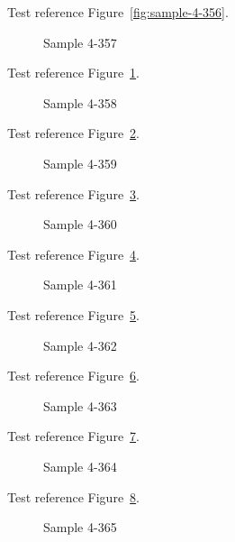 Test reference Figure~\ref{fig:sample-4-356}.

\begin{figure}[tbhp]
\caption{Sample 4-357}
\label{fig:sample-4-357}
\end{figure}

Test reference Figure~\ref{fig:sample-4-357}.

\begin{figure}[tbhp]
\caption{Sample 4-358}
\label{fig:sample-4-358}
\end{figure}

Test reference Figure~\ref{fig:sample-4-358}.

\begin{figure}[tbhp]
\caption{Sample 4-359}
\label{fig:sample-4-359}
\end{figure}

Test reference Figure~\ref{fig:sample-4-359}.

\begin{figure}[tbhp]
\caption{Sample 4-360}
\label{fig:sample-4-360}
\end{figure}

Test reference Figure~\ref{fig:sample-4-360}.

\begin{figure}[tbhp]
\caption{Sample 4-361}
\label{fig:sample-4-361}
\end{figure}

Test reference Figure~\ref{fig:sample-4-361}.

\begin{figure}[tbhp]
\caption{Sample 4-362}
\label{fig:sample-4-362}
\end{figure}

Test reference Figure~\ref{fig:sample-4-362}.

\begin{figure}[tbhp]
\caption{Sample 4-363}
\label{fig:sample-4-363}
\end{figure}

Test reference Figure~\ref{fig:sample-4-363}.

\begin{figure}[tbhp]
\caption{Sample 4-364}
\label{fig:sample-4-364}
\end{figure}

Test reference Figure~\ref{fig:sample-4-364}.

\begin{figure}[tbhp]
\caption{Sample 4-365}
\label{fig:sample-4-365}
\end{figure}


